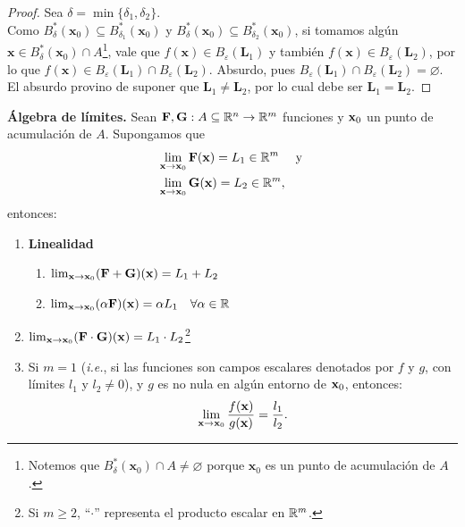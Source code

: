\begin{proof}
 Sea $\delta = \min\{ \delta_1, \delta_2 \}$. \\
 Como $B_{\delta}^*(\mathbf{x}_0)  \subseteq  B_{\delta_1}^*(\mathbf{x}_0)$ y $B_{\delta}^*(\mathbf{x}_0)  \subseteq  B_{\delta_2}^*(\mathbf{x}_0)$, si tomamos alg\'un $\mathbf{x} \in B_{\delta}^*(\mathbf{x}_0) \cap A$\footnote{Notemos que $B_{\delta}^*(\mathbf{x}_0) \cap A \ne \varnothing$ porque $\mathbf{x}_0$ es un punto de acumulaci\'on de $A$.}, vale que $f(\mathbf{x}) \in B_{\varepsilon}(\mathbf{L}_1)$ y tambi\'en $f(\mathbf{x}) \in B_{\varepsilon}(\mathbf{L}_2)$, por lo que $f(\mathbf{x}) \in B_{\varepsilon}(\mathbf{L}_1) \cap B_{\varepsilon}(\mathbf{L}_2)$. Absurdo, pues $B_{\varepsilon}(\mathbf{L}_1) \cap B_{\varepsilon}(\mathbf{L}_2) = \varnothing$. El absurdo provino de suponer que $\mathbf{L}_1 \ne \mathbf{L}_2$, por lo cual debe ser $\mathbf{L}_1 = \mathbf{L}_2$.
\end{proof}


\newpage



\begin{propertie}\textbf{\'Algebra de l\'imites.} \label{prop:alg_lim} 
Sean $\campoVec{F},\campoVec{G}:A \subseteq \Rn{n} \to \Rn{m}$ funciones y $\vect{x}_0$ un punto de acumulaci\'on de $A$. Supongamos que 
\begin{align*} 
&\lim_{\vect{x} \to \vect{x}_0} \campoVec{F}(\vect{x}) = L_1 \in \Rn{m}    \quad \text{ y } \\ 
&\lim_{\vect{x} \to \vect{x}_0} \campoVec{G}(\vect{x}) = L_2 \in \Rn{m},
\end{align*} 
entonces: 
\begin{enumerate} 
\item \textbf{Linealidad} 
\begin{enumerate} 
\item $\lim_{\vect{x} \to \vect{x}_0} (\campoVec{F} + \campoVec{G})(\vect{x}) = L_1 + L_2$ 
\item $\lim_{\vect{x} \to \vect{x}_0} (\alpha \campoVec{F})(\vect{x}) = \alpha L_1 \quad \forall \alpha \in \mathbb{R}$ 
\end{enumerate} 

\item $\lim_{\vect{x} \to \vect{x}_0} (\campoVec{F} \cdot \campoVec{G}) (\vect{x}) = L_1 \cdot L_2$\footnote{Si $m \ge 2$, ``$\cdot$'' representa el producto escalar en $\mathbb{R}^m$.} 

\item Si $m = 1$ (\textit{i.e.}, si las funciones son campos escalares denotados por $f$ y $g$, con l\'imites $l_1$ y $l_2 \ne 0$), y $g$ es no nula en alg\'un entorno de $\vect{x}_0$, entonces: 
\[ 
\lim_{\vect{x} \to \vect{x}_0} \frac{f(\vect{x})}{g(\vect{x})} = \frac{l_1}{l_2}. 
\] 
\end{enumerate} 
\end{propertie}


